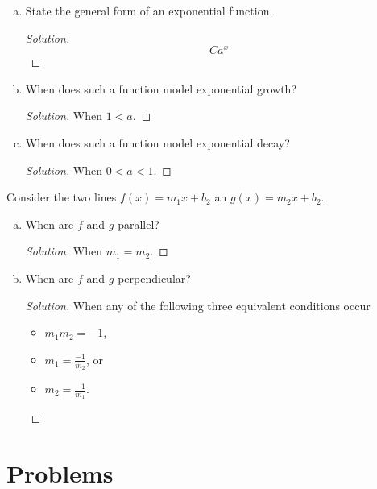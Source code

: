 \documentclass[12pt]{amsart}
\begin{document}
\begin{thm}[3 Points]\label{ex4}
  \begin{enumerate}[(a)]
  \item
    State the general form of an exponential function.
    \begin{proof}[Solution]
      \[Ca^x\]
    \end{proof}
  \item
    When does such a function model exponential growth?
    \begin{proof}[Solution]
      When \(1 < a\).
    \end{proof}
  \item
    When does such a function model exponential decay?
    \begin{proof}[Solution]
      When \(0 < a < 1\).
    \end{proof}
  \end{enumerate}
\end{thm}

\begin{thm}[2 Points]
  Consider the two lines $f(x) = m_1x + b_2$ an $g(x) = m_2x + b_2$.
  \begin{enumerate}[(a)]
  \item
    When are $f$ and $g$ parallel?
    \begin{proof}[Solution]
      When \(m_1 = m_2\).
    \end{proof}
  \item
    When are $f$ and $g$ perpendicular?
    \begin{proof}[Solution]
      When any of the following three equivalent conditions occur
      \begin{itemize}
      \item
        \(\displaystyle{m_1m_2 = -1}\),
      \item
        \(\displaystyle{m_1 = \frac{-1}{m_2}}\), or
      \item
        \(\displaystyle{m_2 = \frac{-1}{m_1}}\).
      \end{itemize}
    \end{proof}
  \end{enumerate}
\end{thm}

\section{Problems}
\end{document}
